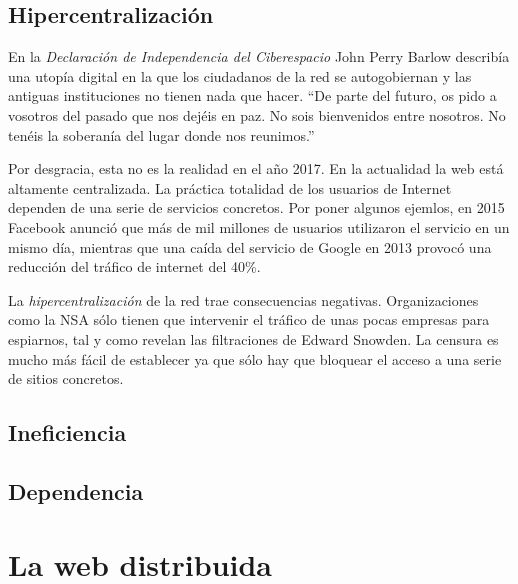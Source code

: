 \documentclass[12pt]{article} %
\begin{document}

\subsection{Hipercentralización} %
\label{sub:hipercentralización}

En la \textit{Declaración de Independencia del Ciberespacio}\cite{cyberspace-independence} John Perry Barlow describía una utopía digital en la que los ciudadanos de la red se autogobiernan y las antiguas instituciones no tienen nada que hacer. ``De parte del futuro, os pido a vosotros del pasado que nos dejéis en paz. No sois bienvenidos entre nosotros. No tenéis la soberanía del lugar donde nos reunimos.'' 

Por desgracia, esta no es la realidad en el año 2017. En la actualidad la web está altamente centralizada. La práctica totalidad de los usuarios de Internet dependen de una serie de servicios concretos. Por poner algunos ejemlos, en 2015 Facebook anunció que más de mil millones de usuarios utilizaron el servicio en un mismo día\cite{billion-facebook}, mientras que una caída del servicio de Google en 2013 provocó una reducción del tráfico de internet del 40\%\cite{google-outage}.

La \textit{hipercentralización} de la red trae consecuencias negativas. Organizaciones como la NSA sólo tienen que intervenir el tráfico de unas pocas empresas para espiarnos, tal y como revelan las filtraciones de Edward Snowden\cite{snowden-leaks}. La censura es mucho más fácil de establecer ya que sólo hay que bloquear el acceso a una serie de sitios concretos. 


\subsection{Ineficiencia} %
\label{sub:ineficiencia}


\subsection{Dependencia} %
\label{sub:dependencia}



\section{La web distribuida} %
\label{sec:la_web_distribuida}
\end{document}
